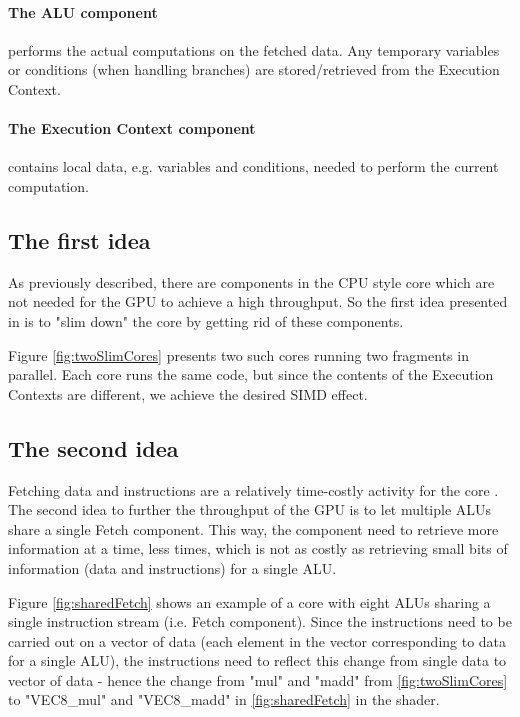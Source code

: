 \paragraph{The \gls{ALU} component} performs the actual computations on the fetched data. Any temporary variables or conditions (when handling branches) are stored/retrieved from the Execution Context.

\paragraph{The Execution Context component} contains local data, e.g. variables and conditions, needed to perform the current computation.

\subsection{The first idea}
As previously described, there are components in the \gls{CPU} style core which are not needed for the \gls{GPU} to achieve a high throughput.
So the first idea presented in \cite{intro_to_gpu_arch} is to "slim down" the core by getting rid of these components.


Figure \ref{fig:twoSlimCores} presents two such cores running two fragments in parallel. 
Each core runs the same code, but since the contents of the Execution Contexts are different, we achieve the desired \gls{SIMD} effect.

\subsection{The second idea}
Fetching data and instructions are a relatively time-costly activity for the core .
The second idea to further the throughput of the \gls{GPU} is to let multiple \glspl{ALU} share a single Fetch component.
This way, the component need to retrieve more information at a time, less times, which is not as costly as retrieving small bits of information (data and instructions) for a single \gls{ALU}.


Figure \ref{fig:sharedFetch} shows an example of a core with eight \glspl{ALU} sharing a single instruction stream (i.e. Fetch component).
Since the instructions need to be carried out on a vector of data (each element in the vector corresponding to data for a single \gls{ALU}), the instructions need to reflect this change from single data to vector of data - hence the change from "mul" and "madd" from \ref{fig:twoSlimCores} to "VEC8\_mul" and "VEC8\_madd" in \ref{fig:sharedFetch} in the shader.

